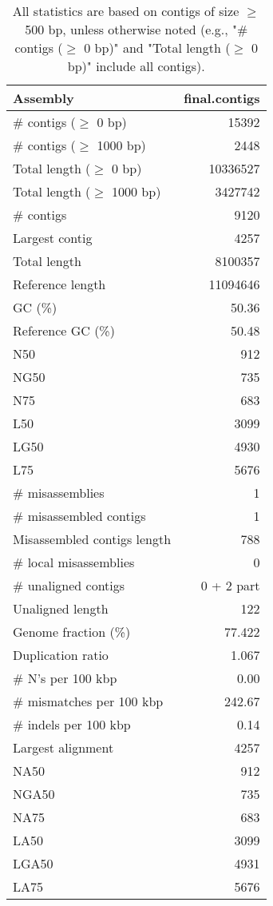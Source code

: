 \documentclass[12pt,a4paper]{article}
\begin{document}
\begin{table}[ht]
\begin{center}
\caption{All statistics are based on contigs of size $\geq$ 500 bp, unless otherwise noted (e.g., "\# contigs ($\geq$ 0 bp)" and "Total length ($\geq$ 0 bp)" include all contigs).}
\begin{tabular}{|l*{1}{|r}|}
\hline
Assembly & final.contigs \\ \hline
\# contigs ($\geq$ 0 bp) & 15392 \\ \hline
\# contigs ($\geq$ 1000 bp) & 2448 \\ \hline
Total length ($\geq$ 0 bp) & 10336527 \\ \hline
Total length ($\geq$ 1000 bp) & 3427742 \\ \hline
\# contigs & 9120 \\ \hline
Largest contig & 4257 \\ \hline
Total length & 8100357 \\ \hline
Reference length & 11094646 \\ \hline
GC (\%) & 50.36 \\ \hline
Reference GC (\%) & 50.48 \\ \hline
N50 & 912 \\ \hline
NG50 & 735 \\ \hline
N75 & 683 \\ \hline
L50 & 3099 \\ \hline
LG50 & 4930 \\ \hline
L75 & 5676 \\ \hline
\# misassemblies & 1 \\ \hline
\# misassembled contigs & 1 \\ \hline
Misassembled contigs length & 788 \\ \hline
\# local misassemblies & 0 \\ \hline
\# unaligned contigs & 0 + 2 part \\ \hline
Unaligned length & 122 \\ \hline
Genome fraction (\%) & 77.422 \\ \hline
Duplication ratio & 1.067 \\ \hline
\# N's per 100 kbp & 0.00 \\ \hline
\# mismatches per 100 kbp & 242.67 \\ \hline
\# indels per 100 kbp & 0.14 \\ \hline
Largest alignment & 4257 \\ \hline
NA50 & 912 \\ \hline
NGA50 & 735 \\ \hline
NA75 & 683 \\ \hline
LA50 & 3099 \\ \hline
LGA50 & 4931 \\ \hline
LA75 & 5676 \\ \hline
\end{tabular}
\end{center}
\end{table}
\end{document}
